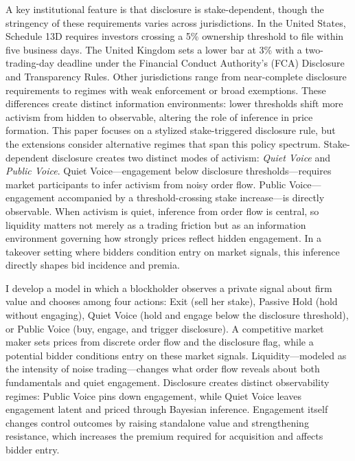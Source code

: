 \documentclass[11pt]{article}
\newcommand{\1}{\mathbf{1}}
\begin{document}
A key institutional feature is that disclosure is stake-dependent, though the stringency of these requirements varies across jurisdictions. In the United States, Schedule 13D requires investors crossing a 5\% ownership threshold to file within five business days. The United Kingdom sets a lower bar at 3\% with a two-trading-day deadline under the Financial Conduct Authority's (FCA) Disclosure and Transparency Rules. Other jurisdictions range from near-complete disclosure requirements to regimes with weak enforcement or broad exemptions. These differences create distinct information environments: lower thresholds shift more activism from hidden to observable, altering the role of inference in price formation. This paper focuses on a stylized stake-triggered disclosure rule, but the extensions consider alternative regimes that span this policy spectrum. Stake-dependent disclosure creates two distinct modes of activism: \emph{Quiet Voice} and \emph{Public Voice}. Quiet Voice---engagement below disclosure thresholds---requires market participants to infer activism from noisy order flow. Public Voice---engagement accompanied by a threshold-crossing stake increase---is directly observable. When activism is quiet, inference from order flow is central, so liquidity matters not merely as a trading friction but as an information environment governing how strongly prices reflect hidden engagement. In a takeover setting where bidders condition entry on market signals, this inference directly shapes bid incidence and premia.

I develop a model in which a blockholder observes a private signal about firm value and chooses among four actions: Exit (sell her stake), Passive Hold (hold without engaging), Quiet Voice (hold and engage below the disclosure threshold), or Public Voice (buy, engage, and trigger disclosure). A competitive market maker sets prices from discrete order flow and the disclosure flag, while a potential bidder conditions entry on these market signals. Liquidity---modeled as the intensity of noise trading---changes what order flow reveals about both fundamentals and quiet engagement. Disclosure creates distinct observability regimes: Public Voice pins down engagement, while Quiet Voice leaves engagement latent and priced through Bayesian inference. Engagement itself changes control outcomes by raising standalone value and strengthening resistance, which increases the premium required for acquisition and affects bidder entry.
\end{document}
